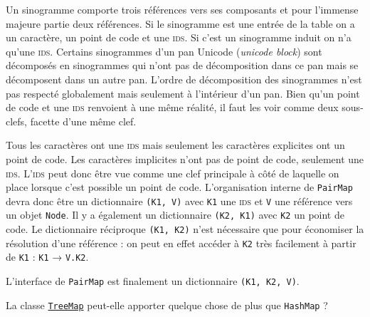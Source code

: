 Un sinogramme comporte trois références vers ses composants et pour l'immense majeure partie deux références. Si le sinogramme est une entrée de la table on a un caractère, un point de code et une \textsc{ids}. Si c'est un sinogramme induit on n'a qu'une \textsc{ids}. Certains sinogrammes d'un pan Unicode (\textsl{unicode block}) sont décomposés en sinogrammes qui n'ont pas de décomposition dans ce pan mais se décomposent dans un autre pan. L'ordre de décomposition des sinogrammes n'est pas respecté globalement mais seulement à l'intérieur d'un pan. Bien qu'un point de code et une \textsc{ids} renvoient à une même réalité, il faut les voir comme deux sous-clefs, facette d'une même clef.

Tous les caractères ont une \textsc{ids} mais seulement les caractères explicites ont un point de code. Les caractères implicites n'ont pas de point de code, seulement une \textsc{ids}. L'\textsc{ids} peut donc être vue comme une clef principale à côté de laquelle on place lorsque c'est possible un point de code. L'organisation interne de \texttt{PairMap} devra donc être un dictionnaire \texttt{(K1, V)} avec \texttt{K1} une \textsc{ids} et \texttt{V} une référence vers un objet \texttt{Node}. Il y a également un dictionnaire \texttt{(K2, K1)} avec \texttt{K2} un point de code. Le dictionnaire réciproque \texttt{(K1, K2)} n'est nécessaire que pour économiser la résolution d'une référence : on peut en effet accéder à \texttt{K2} très facilement à partir de \texttt{K1} : \texttt{K1} → \texttt{V.K2}.

L'interface de \texttt{PairMap} est finalement un dictionnaire \texttt{(K1, K2, V)}.

La classe \href{http://download.java.net/jdk8u20/docs/api/java/util/TreeMap.html}{\texttt{TreeMap}} peut-elle apporter quelque chose de plus que \texttt{HashMap} ?
